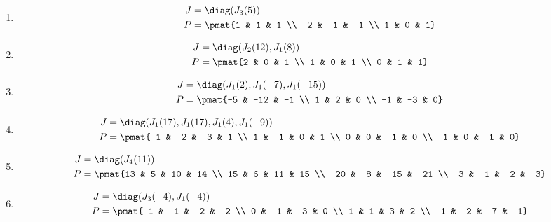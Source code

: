 \begin{enumerate}
\item

\begin{align*}
J &= \diag(J_{3}(5))\\
P &= \pmat{1 & 1 & 1 \\ -2 & -1 & -1 \\ 1 & 0 & 1}
\end{align*}

\item

\begin{align*}
J &= \diag(J_{2}(12), J_{1}(8))\\
P &= \pmat{2 & 0 & 1 \\ 1 & 0 & 1 \\ 0 & 1 & 1}
\end{align*}

\item

\begin{align*}
J &= \diag(J_{1}(2), J_{1}(-7), J_{1}(-15))\\
P &= \pmat{-5 & -12 & -1 \\ 1 & 2 & 0 \\ -1 & -3 & 0}
\end{align*}

\item

\begin{align*}
J &= \diag(J_{1}(17), J_{1}(17), J_{1}(4), J_{1}(-9))\\
P &= \pmat{-1 & -2 & -3 & 1 \\ 1 & -1 & 0 & 1 \\ 0 & 0 & -1 & 0 \\ -1 & 0 & -1 & 0}
\end{align*}

\item

\begin{align*}
J &= \diag(J_{4}(11))\\
P &= \pmat{13 & 5 & 10 & 14 \\ 15 & 6 & 11 & 15 \\ -20 & -8 & -15 & -21 \\ -3 & -1 & -2 & -3}
\end{align*}

\item

\begin{align*}
J &= \diag(J_{3}(-4), J_{1}(-4))\\
P &= \pmat{-1 & -1 & -2 & -2 \\ 0 & -1 & -3 & 0 \\ 1 & 1 & 3 & 2 \\ -1 & -2 & -7 & -1}
\end{align*}


\end{enumerate}
